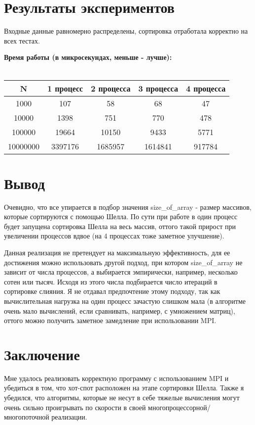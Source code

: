 \documentclass[14pt, a4paper]{extarticle}
\begin{document}
	\newpage

	\section{Результаты экспериментов}
	Входные данные равномерно распределены, сортировка отработала корректно на всех тестах.

	\noindent\textbf{Время работы (в микросекундах, меньше - лучше):}\\\\
\begin{tabular}{|c | c | c | c | c |} 
	\hline
	N & 1 процесс & 2 процесса & 3 процесса & 4 процесса\\
	\hline
	1000 & 107 & 58 & 68  & 47\\ 
	\hline
	10000 & 1398 & 751 & 770 & 478\\
	\hline
	100000 & 19664 & 10150  & 9433 & 5771\\
	\hline
	10000000 & 3397176 & 1685957  & 1614841 & 917784\\
	\hline
\end{tabular}

	\newpage

	\section{Вывод}
        Очевидно, что все упирается в подбор значения size\_of\_array - размер массивов, которые сортируются с помощью Шелла. По сути при     работе в один процесс будет запущена сортировка Шелла на весь массив, оттого такой прирост при увеличении процессов вдвое (на 4 процессах тоже заметное улучшение). 

        Данная реализация не претендует на максимальную эффективность, для ее достижения можно использовать другой подход, при котором size\_of\_array не зависит от числа процессов, а выбирается эмпирически, например, несколько сотен или тысяч. Исходя из этого числа подбирается число итераций в сортировке слияния. Я не отдавал предпочтение этому подходу, так как вычислительная нагрузка на один процесс зачастую слишком мала (в алгоритме очень мало вычислений, если сравнивать, например, с умножением матриц), оттого можно получить заметное замедление при использовании MPI.

	\newpage

	\section{Заключение}
        Мне удалось реализовать корректную программу с использованием MPI и убедиться в том, что хот-спот расположен на этапе сортировки Шелла. Также я убедился, что алгоритмы, которые не несут в себе тяжелые вычисления могут очень сильно проигрывать по скорости в своей многопроцессорной/многопоточной реализации.
\end{document}
